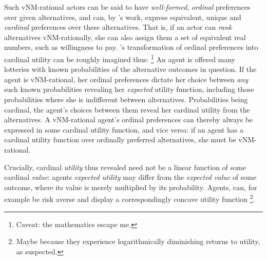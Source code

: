 Such \gls{vNM}-rational actors can be said to have \emph{well-formed}, \emph{ordinal} preferences over given alternatives, and can, by \citeauthor{VonNeumannMorgenstern1944}'s work, express equivalent, unique and \emph{cardinal} preferences over these alternatives.
That is, if an actor can \emph{rank} alternatives \gls{vNM}-rationally, she can also assign them a set of equivalent real numbers, such as willingness to pay.
\citeauthor{VonNeumannMorgenstern1944}'s transformation of ordinal preferences into cardinal utility can be roughly imagined thus:
\footnote{
	Caveat: the mathematics escape me.
}
An agent is offered many lotteries with known probabilities of the alternative outcomes in question.
If the agent is \gls{vNM}-rational, her ordinal preferences dictate her choice between \emph{any} such known probabilities revealing her \emph{expected} utility function, including those probabilities where she is indifferent between alternatives. %
Probabilities being cardinal, the agent's choices between them reveal her cardinal utility from the alternatives. A \gls{vNM}-rational agent's ordinal preferences can thereby always be expressed in some cardinal utility function, and vice versa: if an agent has a cardinal utility function over ordinally preferred alternatives, she must be \gls{vNM}-rational.

Crucially, cardinal \emph{utility} thus revealed need not be a linear function of some cardinal \emph{value}: agents \emph{expected utility} may differ from the \emph{expected value} of some outcome, where its value is merely multiplied by its probability.
Agents, can, for example be risk averse and display a correspondingly concave utility function
\footnote{
	Maybe because they experience logarithmically diminishing returns to utility, as \cite{Bernoulli1738} suspected.
}.

